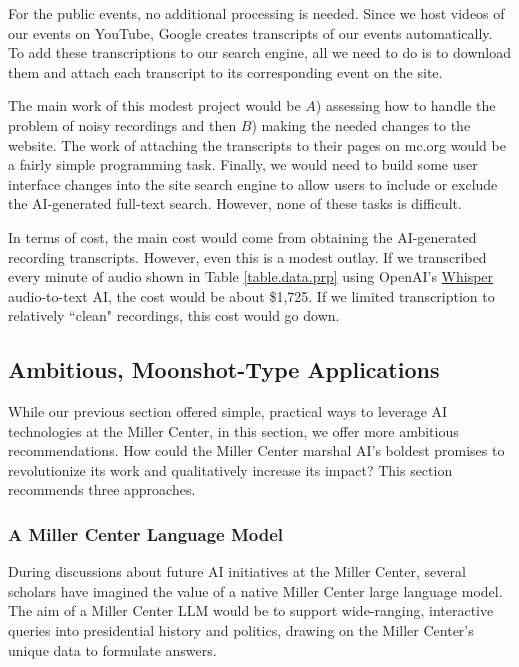 \documentclass[12pt, oneside]{article}   	%
\begin{document}
For the public events, no additional processing is needed.  Since we host videos of our events on YouTube, Google creates transcripts of our events automatically.  To add these transcriptions to our search engine, all we need to do is to download them and attach each transcript to its corresponding event on the site.  

The main work of this modest project would be $A$) assessing how to handle the problem of noisy recordings and then $B$) making the needed changes to the website.  The work of attaching the transcripts to their pages on mc.org would be a fairly simple programming task.  Finally, we would need to build some user interface changes into the site search engine to allow users to include or exclude the AI-generated full-text search.  However, none of these tasks is difficult.

In terms of cost, the main cost would come from obtaining the AI-generated recording transcripts.  However, even this is a modest outlay.  If we transcribed every minute of audio shown in Table \ref{table.data.prp} using OpenAI's \href{https://openai.com/research/whisper}{Whisper} audio-to-text AI, the cost would be about \$1,725.  If we limited transcription to relatively ``clean" recordings, this cost would go down.


\subsection{Ambitious, Moonshot-Type Applications}\label{section.applications.hard}
While our previous section offered simple, practical ways to leverage AI technologies at the Miller Center, in this section, we offer more ambitious recommendations.  How could the Miller Center marshal AI’s boldest promises to revolutionize its work and qualitatively increase its impact?  This section recommends three approaches.


\subsubsection{A Miller Center Language Model}\label{section.applications.hard.mcllm}
During discussions about future AI initiatives at the Miller Center, several scholars have imagined the value of a native Miller Center large language model.  The aim of a Miller Center LLM would be to support wide-ranging, interactive queries into presidential history and politics, drawing on the Miller Center's unique data to formulate answers.
\end{document}
